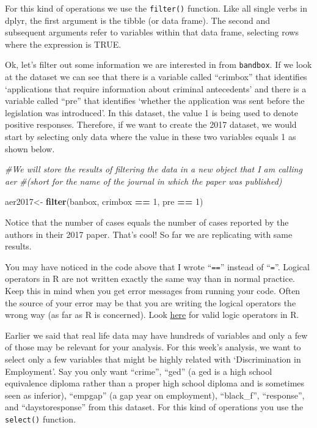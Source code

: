 \documentclass[
]{book}
\newenvironment{Shaded}{\begin{snugshade}}{\end{snugshade}}
\newcommand{\CommentTok}[1]{\textcolor[rgb]{0.56,0.35,0.01}{\textit{#1}}}
\newcommand{\DecValTok}[1]{\textcolor[rgb]{0.00,0.00,0.81}{#1}}
\newcommand{\FunctionTok}[1]{\textcolor[rgb]{0.13,0.29,0.53}{\textbf{#1}}}
\newcommand{\NormalTok}[1]{#1}
\newcommand{\OtherTok}[1]{\textcolor[rgb]{0.56,0.35,0.01}{#1}}
\newcommand{\SpecialCharTok}[1]{\textcolor[rgb]{0.81,0.36,0.00}{\textbf{#1}}}
\begin{document}
For this kind of operations we use the \texttt{filter()} function. Like all single verbs in dplyr, the first argument is the tibble (or data frame). The second and subsequent arguments refer to variables within that data frame, selecting rows where the expression is TRUE.

Ok, let's filter out some information we are interested in from \texttt{bandbox}. If we look at the dataset we can see that there is a variable called ``crimbox'' that identifies `applications that require information about criminal antecedents' and there is a variable called ``pre'' that identifies `whether the application was sent before the legislation was introduced'. In this dataset, the value 1 is being used to denote positive responses. Therefore, if we want to create the 2017 dataset, we would start by selecting only data where the value in these two variables equals 1 as shown below.

\begin{Shaded}
\begin{Highlighting}[]
\CommentTok{\#We will store the results of filtering the data in a new object that I am calling aer  }
\CommentTok{\#(short for the name of the journal in which the paper was published)}

\NormalTok{aer2017}\OtherTok{\textless{}{-}} \FunctionTok{filter}\NormalTok{(banbox, crimbox }\SpecialCharTok{==} \DecValTok{1}\NormalTok{, pre }\SpecialCharTok{==} \DecValTok{1}\NormalTok{)}
\end{Highlighting}
\end{Shaded}

Notice that the number of cases equals the number of cases reported by the authors in their 2017 paper. That's cool! So far we are replicating with same results.

You may have noticed in the code above that I wrote ``\texttt{==}'' instead of ``\texttt{=}''. Logical operators in R are not written exactly the same way than in normal practice. Keep this in mind when you get error messages from running your code. Often the source of your error may be that you are writing the logical operators the wrong way (as far as R is concerned). Look \href{https://www.statmethods.net/management/operators.html}{here} for valid logic operators in R.

Earlier we said that real life data may have hundreds of variables and only a few of those may be relevant for your analysis. For this week's analysis, we want to select only a few variables that might be highly related with `Discrimination in Employment'. Say you only want ``crime'', ``ged'' (a ged is a high school equivalence diploma rather than a proper high school diploma and is sometimes seen as inferior), ``empgap'' (a gap year on employment), ``black\_f'', ``response'', and ``daystoresponse'' from this dataset. For this kind of operations you use the \texttt{select()} function.
\end{document}
